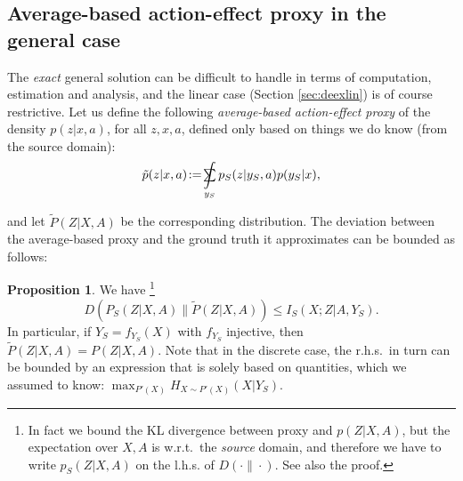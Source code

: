 \documentclass[letterpaper]{article} %
\theoremstyle{definition}%
\theoremstyle{definition}
\newtheorem{proposition}{Proposition}
\newcommand{\kl}{D}
\newcommand{\mi}{I}
\newcommand{\se}{H}
\newcommand{\Obs}{Y}
\newcommand{\obs}{y}
\newcommand{\Out}{Z}
\newcommand{\out}{z}
\newcommand{\todo}[1]{\textcolor{red}{#1}}
\DeclareMathOperator*{\SumInt}{%
	\mathchoice%
	{\ooalign{$\sum$\cr\hidewidth$\displaystyle\int$\hidewidth\cr}}
	{\ooalign{\raisebox{.14\height}{\scalebox{.7}{$\textstyle\sum$}}\cr\hidewidth$\textstyle\int$\hidewidth\cr}}
	{\ooalign{\raisebox{.2\height}{\scalebox{.6}{$\scriptstyle\sum$}}\cr$\scriptstyle\int$\cr}}
	{\ooalign{\raisebox{.2\height}{\scalebox{.6}{$\scriptstyle\sum$}}\cr$\scriptstyle\int$\cr}}
}
\newcommand{\keepifspace}{}
\begin{document}
\subsection{Average-based action-effect proxy in the general case}
\label{sec:deav}






The \emph{exact} general solution can be difficult to handle in terms of computation, estimation and analysis, and the linear case (Section \ref{sec:deexlin}) is of course restrictive.
Let us define the following \emph{average-based action-effect proxy} of the density $p(\out|x, a)$, for all $\out,x,a$, defined only based on things we do know (from the source domain):

\begin{align}
\tilde{p}(\out|x, a)\! :=\! \SumInt_{\obs_S} p_S(\out|\obs_S, a) p(y_S|x), \label{eqn:avp}
\end{align}

and let  $\tilde{P}(\Out|X, A)$ be the corresponding distribution.
The deviation between the average-based proxy and the ground truth it approximates can be bounded as follows: %

\begin{proposition}
	\label{thm:weightedproxy}
	We have%
	\footnote{In fact we bound the KL divergence between proxy and $p(\Out|X, A)$, but the expectation over $X, A$ is w.r.t.\ the \emph{source} domain, and therefore we have to write $p_S(\Out|X, A)$ on the l.h.s. of $\kl(\cdot \| \cdot)$. See also the proof.}
\[
\kl(P_S(\Out|X, A) \| \tilde{P}(\Out|X, A))
\leq \mi_S(X ; \Out | A, \Obs_S).
\]
\keepifspace{In particular, if $\Obs_S = f_{\Obs_S}(X)$ with $f_{\Obs_S}$ injective, then $\tilde{P}(\Out|X, A) = P(\Out|X, A)$.}
	Note that in the discrete case, the r.h.s.\ in turn can be bounded by an expression that is solely based on quantities, which we assumed to know:
	$
	\max_{P'(X)} \se_{X \sim P'(X)} (X | \Obs_S).
	$
\end{proposition}
%
%
%
\end{document}
